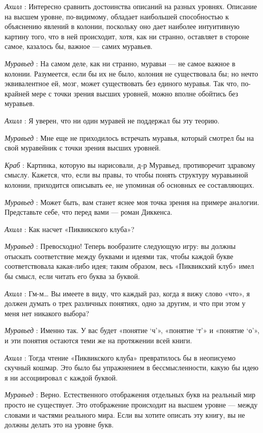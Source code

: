 \documentclass[../main.tex]{subfiles}
\begin{document}
\begin{dialogue}
\emph{Ахилл} : Интересно сравнить достоинства описаний на разных уровнях. Описание на высшем уровне, по-видимому, обладает наибольшей способностью к объяснению явлений в колонии, поскольку оно дает наиболее интуитивную картину того, что в ней происходит, хотя, как ни странно, оставляет в стороне самое, казалось бы, важное --- самих муравьев.

\emph{Муравьед} : На самом деле, как ни странно, муравьи --- не самое важное в колонии. Разумеется, если бы их не было, колония не существовала бы; но нечто эквивалентное ей, мозг, может существовать без единого муравья. Так что, по-крайней мере с точки зрения высших уровней, можно вполне обойтись без муравьев.

\emph{Ахилл} : Я уверен, что ни один муравей не поддержал бы эту теорию.

\emph{Муравьед} : Мне еще не приходилось встречать муравья, который смотрел бы на свой муравейник с точки зрения высших уровней.

\emph{Краб} : Картинка, которую вы нарисовали, д-р Муравьед, противоречит здравому смыслу. Кажется, что, если вы правы, то чтобы понять структуру муравьиной колонии, приходится описывать ее, не упоминая об основных ее составляющих.

\emph{Муравьед} : Может быть, вам станет яснее моя точка зрения на примере аналогии. Представьте себе, что перед вами --- роман Диккенса.

\emph{Ахилл} : Как насчет «Пиквикского клуба»?

\emph{Муравьед} : Превосходно! Теперь вообразите следующую игру: вы должны отыскать соответствие между буквами и идеями так, чтобы каждой букве соответствовала какая-либо идея; таким образом, весь «Пиквикский клуб» имел бы смысл, если читать его буква за буквой.

\emph{Ахилл} : Гм-м\ldots{} Вы имеете в виду, что каждый раз, когда я вижу слово «что», я должен думать о трех различных понятиях, одно за другим, и что при этом у меня нет никакого выбора?

\emph{Муравьед} : Именно так. У вас будет «понятие \enquote*{ч}», «понятие \enquote*{т}» и «понятие \enquote*{о}», и эти понятия остаются теми же на протяжении всей книги.

\emph{Ахилл} : Тогда чтение «Пиквикского клуба» превратилось бы в неописуемо скучный кошмар. Это было бы упражнением в бессмысленности, какую бы идею я ни ассоциировал с каждой буквой.

\emph{Муравьед} : Верно. Естественного отображения отдельных букв на реальный мир просто не существует. Это отображение происходит на высшем уровне --- между словами и частями реального мира. Если вы хотите описать эту книгу, вы не должны делать это на уровне букв.


\end{dialogue}
\end{document}
